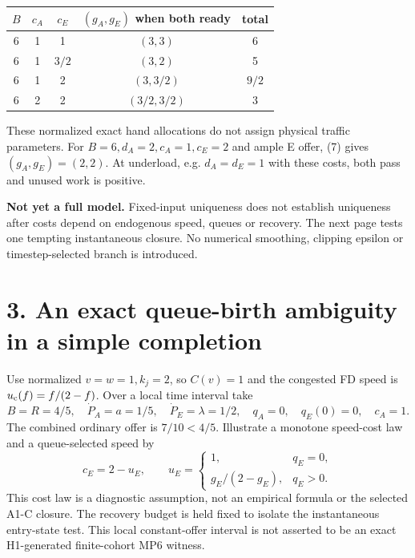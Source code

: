 \documentclass[11pt,a4paper]{article}
\begin{document}
\begin{center}
\begin{tabular}{c c c c c}
$B$ & $c_A$ & $c_E$ & $(g_A,g_E)$ when both ready & total\\\hline
6 & 1 & 1 & $(3,3)$ & 6\\
6 & 1 & $3/2$ & $(3,2)$ & 5\\
6 & 1 & 2 & $(3,3/2)$ & $9/2$\\
6 & 2 & 2 & $(3/2,3/2)$ & 3
\end{tabular}
\end{center}

These normalized exact hand allocations do not assign physical traffic
parameters. For $B=6,d_A=2,c_A=1,c_E=2$ and ample E offer, (7) gives
$(g_A,g_E)=(2,2)$. At underload, e.g. $d_A=d_E=1$ with these costs,
both pass and unused work is positive.

\textbf{Not yet a full model.} Fixed-input uniqueness does not establish
uniqueness after costs depend on endogenous speed, queues or recovery.
The next page tests one tempting instantaneous closure. No numerical
smoothing, clipping epsilon or timestep-selected branch is introduced.

\newpage
\section*{3. An exact queue-birth ambiguity in a simple completion}

Use normalized $v=w=1,k_j=2$, so $C(v)=1$ and the congested FD speed is
$u_{\rm c}(f)=f/(2-f)$. Over a local time interval take
\begin{equation}
 B=R=4/5,\quad \dot P_A=a=1/5,\quad \dot P_E=\lambda=1/2,
 \quad q_A=0,\quad q_E(0)=0,\quad c_A=1. \tag{8}
\end{equation}
The combined ordinary offer is $7/10<4/5$. Illustrate a monotone speed-cost
law and a queue-selected speed by
\begin{equation}
 c_E=2-u_E,\qquad
 u_E=\begin{cases}1,&q_E=0,\\ g_E/(2-g_E),&q_E>0.\end{cases} \tag{9}
\end{equation}
This cost law is a diagnostic assumption, not an empirical formula or
the selected A1-C closure. The recovery budget is held fixed to isolate
the instantaneous entry-state test. This local constant-offer interval
is not asserted to be an exact H1-generated finite-cohort MP6 witness.
\end{document}

